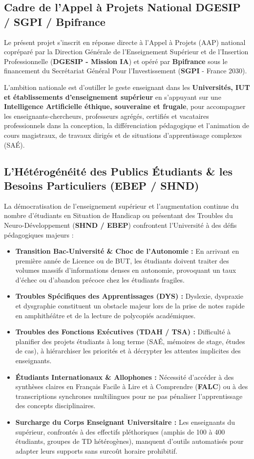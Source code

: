 \documentclass[11pt,a4paper]{article}
\begin{document}
\subsection{Cadre de l'Appel à Projets National DGESIP / SGPI / Bpifrance}
Le présent projet s'inscrit en réponse directe à l'Appel à Projets (AAP) national copréparé par la Direction Générale de l'Enseignement Supérieur et de l'Insertion Professionnelle (\textbf{DGESIP - Mission IA}) et opéré par \textbf{Bpifrance} sous le financement du Secrétariat Général Pour l'Investissement (\textbf{SGPI} - France 2030).

L'ambition nationale est d'outiller le geste enseignant dans les \textbf{Universités, IUT et établissements d'enseignement supérieur} en s'appuyant sur une \textbf{Intelligence Artificielle éthique, souveraine et frugale}, pour accompagner les enseignants-chercheurs, professeurs agrégés, certifiés et vacataires professionnels dans la conception, la différenciation pédagogique et l'animation de cours magistraux, de travaux dirigés et de situations d'apprentissage complexes (SAÉ).

\subsection{L'Hétérogénéité des Publics Étudiants \& les Besoins Particuliers (EBEP / SHND)}
La démocratisation de l'enseignement supérieur et l'augmentation continue du nombre d'étudiants en Situation de Handicap ou présentant des Troubles du Neuro-Développement (\textbf{SHND / EBEP}) confrontent l'Université à des défis pédagogiques majeurs :
\begin{itemize}[leftmargin=1.5em, itemsep=3pt]
    \item \textbf{Transition Bac-Université \& Choc de l'Autonomie :} En arrivant en première année de Licence ou de BUT, les étudiants doivent traiter des volumes massifs d'informations denses en autonomie, provoquant un taux d'échec ou d'abandon précoce chez les étudiants fragiles.
    \item \textbf{Troubles Spécifiques des Apprentissages (DYS) :} Dyslexie, dyspraxie et dysgraphie constituent un obstacle majeur lors de la prise de notes rapide en amphithéâtre et de la lecture de polycopiés académiques.
    \item \textbf{Troubles des Fonctions Exécutives (TDAH / TSA) :} Difficulté à planifier des projets étudiants à long terme (SAÉ, mémoires de stage, études de cas), à hiérarchiser les priorités et à décrypter les attentes implicites des enseignants.
    \item \textbf{Étudiants Internationaux \& Allophones :} Nécessité d'accéder à des synthèses claires en Français Facile à Lire et à Comprendre (\textbf{FALC}) ou à des transcriptions synchrones multilingues pour ne pas pénaliser l'apprentissage des concepts disciplinaires.
    \item \textbf{Surcharge du Corps Enseignant Universitaire :} Les enseignants du supérieur, confrontés à des effectifs pléthoriques (amphis de 100 à 400 étudiants, groupes de TD hétérogènes), manquent d'outils automatisés pour adapter leurs supports sans surcoût horaire prohibitif.
\end{itemize}
\end{document}

